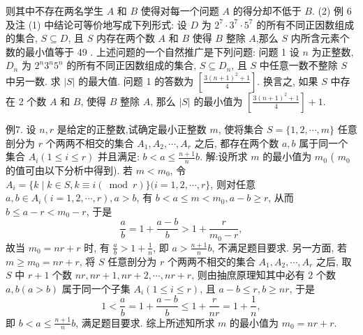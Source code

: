 则其中不存在两名学生 $A$ 和 $B$ 使得对每一个问题 $A$ 的得分却不低于 $B$.
(2) 例 6 及注 (1) 中结论可等价地写成下列形式: 设 $D$ 为 $2^7 \cdot 3^7 \cdot 5^7$ 的所有不同正因数组成的集合, $S \subseteq D$, 且 $S$ 内存在两个数 $A$ 和 $B$ 使得 $B$ 整除 $A$,那么 $S$ 内所含元素个数的最小值等于 49 .
上述问题的一个自然推广是下列问题:
问题 1 设 $n$ 为正整数, $D_n$ 为 $2^n 3^n 5^n$ 的所有不同正因数组成的集合, $S \subseteq D_n$, 且 $S$ 中任意一数不整除 $S$ 中另一数.
求 $|S|$ 的最大值.
问题 1 的答数为 $\left[\frac{3(n+1)^2+1}{4}\right]$. 换言之, 如果 $S$ 中存在 2 个数 $A$ 和 $B$, 使得 $B$ 整除 $A$, 那么 $|S|$ 的最小值为 $\left[\frac{3(n+1)^2+1}{4}\right]+1$.



例7. 设 $n, r$ 是给定的正整数,试确定最小正整数 $m$, 使将集合 $S= \{1,2, \cdots, m\}$ 任意剖分为 $r$ 个两两不相交的集合 $A_1, A_2, \cdots, A_r$ 之后, 都存在两个数 $a, b$ 属于同一个集合 $A_i(1 \leqslant i \leqslant r)$ 并且满足: $b<a \leqslant \frac{n+1}{n} b$. 
解:设所求 $m$ 的最小值为 $m_0$ ( $m_0$ 的值可由以下分析中得到).
若 $m<m_0$, 令 $A_i=\{k \mid k \in S, k \equiv i(\bmod r)\}(i=1,2, \cdots, r\}$, 则对任意 $a, b \in A_i(i=1,2, \cdots, r), a>b$, 有 $b<a \leqslant m<m_0, a-b \geqslant r$, 从而 $b \leqslant a-r<m_0-r$, 于是
$$
\frac{a}{b}=1+\frac{a-b}{b}>1+\frac{r}{m_0-r},
$$
故当 $m_0=n r+r$ 时, 有 $\frac{a}{b}>1+\frac{1}{n}$, 即 $a>\frac{n+1}{n} b$, 不满足题目要求.
另一方面, 若 $m \geqslant m_0=n r+r$, 将 $S$ 任意剖分为 $r$ 个两两不相交的集合 $A_1, A_2, \cdots, A_r$ 之后, 取 $S$ 中 $r+1$ 个数 $n r, n r+1, n r+2, \cdots, n r+r$, 则由抽庶原理知其中必有 2 个数 $a, b(a>b)$ 属于同一个子集 $A_i(1 \leqslant i \leqslant r)$, 且 $a-b \leqslant r, b \geqslant n r$, 于是
$$
1<\frac{a}{b}=1+\frac{a-b}{b} \leqslant 1+\frac{r}{n r}=1+\frac{1}{n},
$$
即 $b<a \leqslant \frac{n+1}{n} b$, 满足题目要求.
综上所述知所求 $m$ 的最小值为 $m_0=n r+r$.



